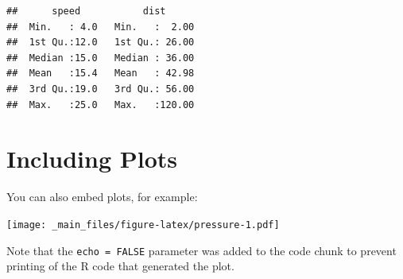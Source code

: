 \documentclass[
]{book}
\begin{document}
\begin{verbatim}
##      speed           dist       
##  Min.   : 4.0   Min.   :  2.00  
##  1st Qu.:12.0   1st Qu.: 26.00  
##  Median :15.0   Median : 36.00  
##  Mean   :15.4   Mean   : 42.98  
##  3rd Qu.:19.0   3rd Qu.: 56.00  
##  Max.   :25.0   Max.   :120.00
\end{verbatim}

\hypertarget{including-plots}{%
\section{Including Plots}\label{including-plots}}

You can also embed plots, for example:

\texttt{[image: \_main\_files/figure-latex/pressure-1.pdf]}

Note that the \texttt{echo\ =\ FALSE} parameter was added to the code chunk to prevent printing of the R code that generated the plot.

  
\end{document}
